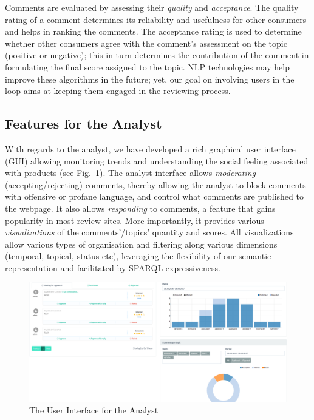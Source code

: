 \documentclass[runningheads,a4paper]{llncs}
\makeatletter
\def\maxwidth#1{\ifdim\Gin@nat@width>#1 #1\else\Gin@nat@width\fi}
\makeatother
\begin{document}
Comments are evaluated by assessing their {\em quality} and {\em acceptance}. The quality rating of a comment determines its reliability and usefulness for other consumers and helps in ranking the comments. The acceptance rating is used to determine whether other consumers agree with the comment's assessment on the topic (positive or negative); this in turn determines the contribution of the comment in formulating the final score assigned to the topic. NLP technologies may help improve these algorithms in the future; yet, our goal on involving users in the loop aims at keeping them engaged in the reviewing process.

\subsection{Features for the Analyst}

With regards to the analyst, we have developed a rich graphical user interface (GUI) allowing monitoring trends and understanding the social feeling associated with products (see Fig.~\ref{_Ref490743665}). The analyst interface allows {\em moderating} (accepting/rejecting) comments, thereby allowing the analyst to block comments with offensive or profane language, and control what comments are published to the webpage. It also allows {\em responding} to comments, a feature that gains popularity in most review sites. More importantly, it provides various {\em visualizations} of the comments'/topics' quantity and scores. All visualizations allow various types of organisation and filtering along various dimensions (temporal, topical, status etc), leveraging the flexibility of our semantic representation and facilitated by SPARQL expressiveness.
\begin{figure}[h!]
\centering
\includegraphics[width=\maxwidth{\textwidth}]{./img/image3.png}
\cprotect\caption{ The User Interface for the Analyst}
\label{_Ref490743665}
\end{figure}
\end{document}

